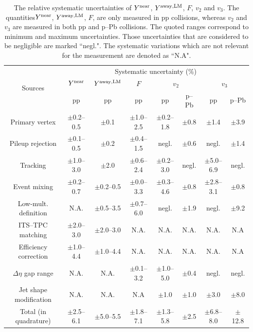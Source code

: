 \begin{table}[h!]
\caption{The relative systematic uncertainties of $Y^{\rm{near}}$, $Y^{\rm{away,LM}}$, $F$, $v_{2}$ and $v_{3}$. The quantities$Y^{\rm{near}}$, $Y^{\rm{away,LM}}$, $F$, are only measured in pp collisions, whereas $v_{2}$ and $v_{3}$ are measured in both pp and p--Pb collisions. The quoted ranges correspond to minimum and maximum uncertainties. Those uncertainties that are considered to be negligible are marked ``negl.". The systematic variations which are not relevant for the measurement are denoted as ``N.A".}
\centering
\label{tab:syst}
\resizebox{\textwidth}{!} {
\begin{tabular}{c|ccc|cccc}
\hline 
\multirow{3}{*}{Sources}  & \multicolumn{7}{c}{Systematic uncertainty (\%)} \\ \cline{2-8} 
& \multicolumn{1}{c}{$Y^{\rm{near}}$} & \multicolumn{1}{c}{$Y^{\rm{away,LM}}$} & \multicolumn{1}{c|}{$F$} & \multicolumn{2}{c}{$v_{2}$} & \multicolumn{2}{c}{$v_{3}$}  \\  \cline{2-8}
&pp &pp &pp & pp & p--Pb & pp & p--Pb  \\ \cline{1-8} 
Primary vertex       & $\pm$0.2--0.5 & $\pm$0.1      & $\pm$1.0--2.5 & $\pm$0.2--1.8 & $\pm$0.8 & $\pm$1.4 & $\pm$3.9 \\ 
Pileup rejection     & $\pm$0.1--0.5 & $\pm$0.2      & $\pm$0.4--1.5 & negl.         & $\pm$0.6 & negl. & $\pm$1.4 \\ 
Tracking		     & $\pm$1.0--3.0 & $\pm$2.0      & $\pm$0.6--2.4 & $\pm$0.2--3.0 & negl. & $\pm$5.0--6.9 & negl. \\ 
Event mixing	     & $\pm$0.2--0.7 & $\pm$0.2--0.5 & $\pm$0.0--3.3 & $\pm$0.3--4.6 & $\pm$0.8 & $\pm$2.8--3.1 & $\pm$0.8 \\ 
Low-mult. definition & N.A.          & $\pm$0.5--3.5 & $\pm$0.7--6.0 & negl.         & $\pm$1.9 & negl. & $\pm$9.2\\ 
ITS--TPC matching 	 & $\pm$2.0--3.0 & $\pm$2.0--3.0 & N.A.          & N.A.          & N.A. & N.A. & N.A\\ 
Efficiency correction& $\pm$1.0--4.4 & $\pm$1.0--4.4 & N.A.          & N.A.          & N.A. & N.A. & N.A\\ 
$\Delta\eta$ gap range   	 & N.A.          & N.A.          & $\pm$0.1--3.2 & $\pm$1.0--5.0 & $\pm$0.4 & negl. & negl. \\ 
Jet shape modification   	 & N.A.          & N.A.          & N.A &  $\pm$1.0& $\pm$1.0 & $\pm$3.0 & $\pm$8.0 \\ 
\hline 
Total (in quadrature)& $\pm$2.5--6.1 & $\pm$5.0--5.5 & $\pm$1.8--7.1 & $\pm$1.3--5.8 & $\pm$2.5 & $\pm$6.8--8.0 & $\pm$12.8 \\ 
\hline 
\end{tabular}
}
\end{table}

